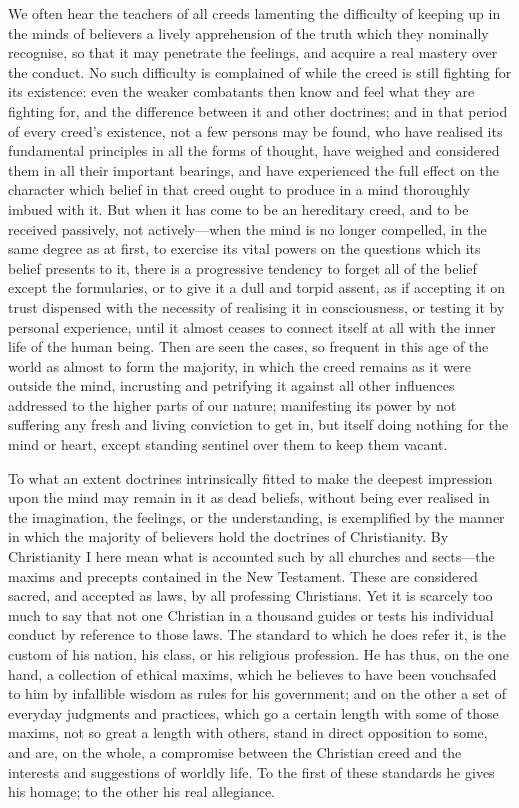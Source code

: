 \documentclass[11pt,openany]{book}
\begin{document}
We often hear the teachers of all creeds lamenting the difficulty of keeping up in the minds of believers a lively apprehension of the truth which they nominally recognise, so that it may penetrate the feelings, and acquire a real mastery over the conduct. No such difficulty is complained of while the creed is still fighting for its existence: even the weaker combatants then know and feel what they are fighting for, and the difference between it and other doctrines; and in that period of every creed's existence, not a few persons may be found, who have realised its fundamental principles in all the forms of thought, have weighed and considered them in all their important bearings, and have experienced the full effect on the character which belief in that creed ought to produce in a mind thoroughly imbued with it. But when it has come to be an hereditary creed, and to be received passively, not actively---when the mind is no longer compelled, in the same degree as at first, to exercise its vital powers on the questions which its belief presents to it, there is a progressive tendency to forget all of the belief except the formularies, or to give it a dull and torpid assent, as if accepting it on trust dispensed with the necessity of realising it in consciousness, or testing it by personal experience, until it almost ceases to connect itself at all with the inner life of the human being. Then are seen the cases, so frequent in this age of the world as almost to form the majority, in which the creed remains as it were outside the mind, incrusting and petrifying it against all other influences addressed to the higher parts of our nature; manifesting its power by not suffering any fresh and living conviction to get in, but itself doing nothing for the mind or heart, except standing sentinel over them to keep them vacant.

To what an extent doctrines intrinsically fitted to make the deepest impression upon the mind may remain in it as dead beliefs, without being ever realised in the imagination, the feelings, or the understanding, is exemplified by the manner in which the majority of believers hold the doctrines of Christianity. By Christianity I here mean what is accounted such by all churches and sects---the maxims and precepts contained in the New Testament. These are considered sacred, and accepted as laws, by all professing Christians. Yet it is scarcely too much to say that not one Christian in a thousand guides or tests his individual conduct by reference to those laws. The standard to which he does refer it, is the custom of his nation, his class, or his religious profession. He has thus, on the one hand, a collection of ethical maxims, which he believes to have been vouchsafed to him by infallible wisdom as rules for his government; and on the other a set of everyday judgments and practices, which go a certain length with some of those maxims, not so great a length with others, stand in direct opposition to some, and are, on the whole, a compromise between the Christian creed and the interests and suggestions of worldly life. To the first of these standards he gives his homage; to the other his real allegiance.
\end{document}
